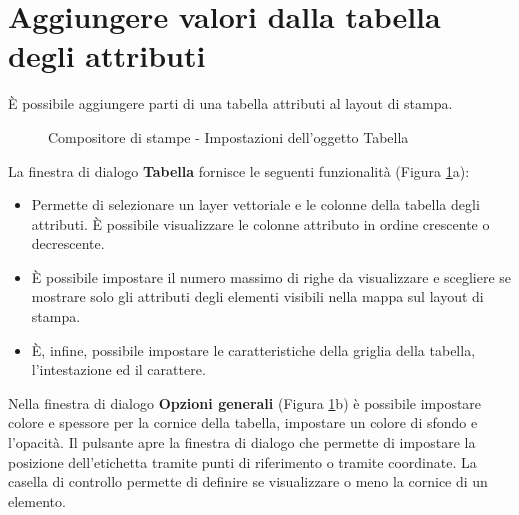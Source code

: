 \section{Aggiungere valori dalla tabella degli attributi}

È possibile aggiungere parti di una tabella attributi al layout di stampa.

\begin{figure}[ht]
\centering
{}
\hspace{1cm}
\caption{Compositore di stampe - Impostazioni dell'oggetto Tabella \nixcaption}\label{fig:attrcomp}
\end{figure}


La finestra di dialogo \textbf{Tabella} fornisce le seguenti funzionalità (Figura \ref{fig:attrcomp}a):

\begin{itemize}[label=--]
\item Permette di selezionare un layer vettoriale e le colonne della tabella degli attributi. È possibile visualizzare 
le colonne attributo in ordine crescente o decrescente. 
\item È possibile impostare il numero massimo di righe da visualizzare e scegliere se mostrare solo gli attributi 
degli elementi visibili nella mappa sul layout di stampa.
\item È, infine, possibile impostare le caratteristiche della griglia della tabella, l'intestazione ed il carattere.
\end{itemize}


Nella finestra di dialogo \textbf{Opzioni generali} (Figura \ref{fig:attrcomp}b) è possibile impostare colore e spessore per la cornice della tabella, impostare 
un colore di sfondo e l'opacità. Il pulsante  apre la finestra di 
dialogo  che permette di impostare la posizione dell'etichetta 
tramite punti di riferimento o tramite coordinate.
La casella di controllo  permette di definire se visualizzare o 
meno la cornice di un elemento.

